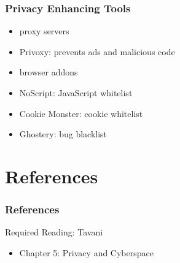 \documentclass[dvipsnames]{beamer}
\theoremstyle{plain}
\begin{document}
\begin{frame}
  \frametitle{Privacy Enhancing Tools}

  \begin{itemize}
    \item proxy servers
    \item Privoxy: prevents ads and malicious code

    \pause
    \medskip
    \item browser addons
    \item NoScript: JavaScript whitelist
    \item Cookie Monster: cookie whitelist
    \item Ghostery: bug blacklist
  \end{itemize}
\end{frame}

\section*{References}

\begin{frame}
  \frametitle{References}

  \begin{block}{Required Reading: Tavani}
    \begin{itemize}
      \item Chapter 5: \alert{Privacy and Cyberspace}
    \end{itemize}
  \end{block}
\end{frame}
\end{document}
